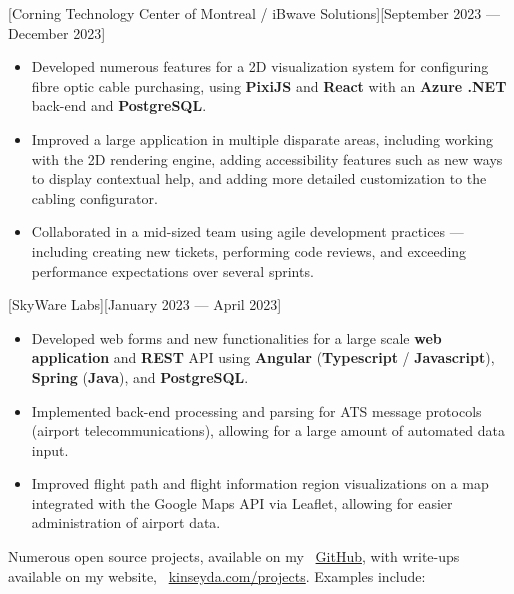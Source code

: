 \documentclass{article}
\begin{document}
\vspace*{\fill}


[Corning Technology Center of Montreal /
	iBwave Solutions][September 2023 --- December 2023]

\begin{itemize}
	\item Developed numerous features for a 2D visualization system for
	      configuring fibre optic cable purchasing, using \textbf{PixiJS} and
	      \textbf{React} with an \textbf{Azure .NET} back-end and
	      \textbf{PostgreSQL}.
	\item Improved a large application in multiple disparate areas, including
	      working with the 2D rendering engine, adding accessibility features
	      such as new ways to display contextual help, and adding more detailed
	      customization to the cabling configurator.
	\item Collaborated in a mid-sized team using agile development practices ---
	      including creating new tickets, performing code reviews, and exceeding
	      performance expectations over several sprints.
\end{itemize}

[SkyWare Labs][January 2023 --- April 2023]

\begin{itemize}
	\item Developed web forms and new functionalities for a large scale
	      \textbf{web application} and \textbf{REST} API using
	      \textbf{Angular} (\textbf{Typescript} / \textbf{Javascript}),
	      \textbf{Spring} (\textbf{Java}), and \textbf{PostgreSQL}.
	\item Implemented back-end processing and parsing for ATS message protocols
	      (airport telecommunications), allowing for a large amount of automated
	      data input.
	\item Improved flight path and flight information region visualizations on a
	      map integrated with the Google Maps API via Leaflet, allowing for
	      easier administration of airport data.
\end{itemize}

\vspace*{\fill}


Numerous open source projects, available on my \faGithub\
\href{https://github.com/kinseyda}{GitHub}, with write-ups available on my
website, \faGlobe\ \href{https://kinseyda.com/projects}{kinseyda.com/projects}.
Examples include:
\end{document}
